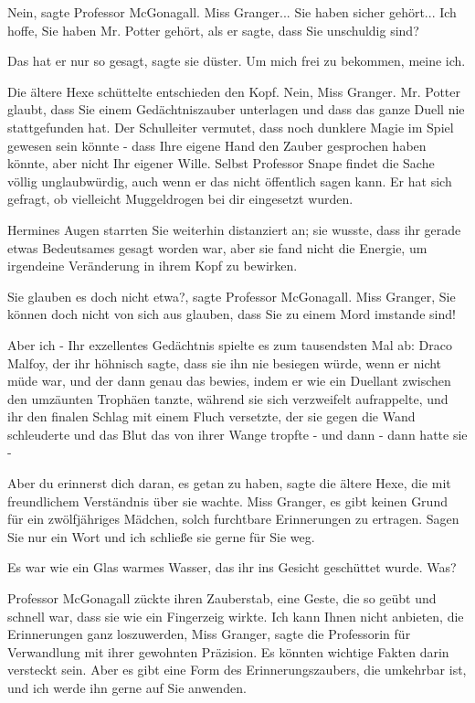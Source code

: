 \glqq Nein\grqq{}, sagte Professor McGonagall. \glqq Miss Granger... Sie haben
sicher gehört... Ich hoffe, Sie haben Mr. Potter gehört, als er sagte, dass Sie
unschuldig sind?\grqq{}

\glqq Das hat er nur so gesagt\grqq{}, sagte sie düster. \glqq Um mich frei zu
bekommen, meine ich.\grqq{}

Die ältere Hexe schüttelte entschieden den Kopf. \glqq Nein, Miss Granger. Mr.
Potter glaubt, dass Sie einem Gedächtniszauber unterlagen und dass das ganze
Duell nie stattgefunden hat. Der Schulleiter vermutet, dass noch dunklere Magie
im Spiel gewesen sein könnte - dass Ihre eigene Hand den Zauber gesprochen haben
könnte, aber nicht Ihr eigener Wille. Selbst Professor Snape findet die Sache
völlig unglaubwürdig, auch wenn er das nicht öffentlich sagen kann. Er hat sich
gefragt, ob vielleicht Muggeldrogen bei dir eingesetzt wurden.\grqq{}

Hermines Augen starrten Sie weiterhin distanziert an; sie wusste, dass ihr
gerade etwas Bedeutsames gesagt worden war, aber sie fand nicht die Energie, um
irgendeine Veränderung in ihrem Kopf zu bewirken.

\glqq Sie glauben es doch nicht etwa?\grqq{}, sagte Professor McGonagall. \glqq
Miss Granger, Sie können doch nicht von sich aus glauben, dass Sie zu einem Mord
imstande sind!\grqq{}

\glqq Aber ich -\grqq{} Ihr exzellentes Gedächtnis spielte es zum tausendsten
Mal ab: Draco Malfoy, der ihr höhnisch sagte, dass sie ihn nie besiegen würde,
wenn er nicht müde war, und der dann genau das bewies, indem er wie ein Duellant
zwischen den umzäunten Trophäen tanzte, während sie sich verzweifelt
aufrappelte, und ihr den finalen Schlag mit einem Fluch versetzte, der sie gegen
die Wand schleuderte und das Blut das von ihrer Wange tropfte - und dann - dann
hatte sie -

\glqq Aber du erinnerst dich daran, es getan zu haben\grqq{}, sagte die ältere
Hexe, die mit freundlichem Verständnis über sie wachte. \glqq Miss Granger, es
gibt keinen Grund für ein zwölfjähriges Mädchen, solch furchtbare Erinnerungen
zu ertragen. Sagen Sie nur ein Wort und ich schließe sie gerne für Sie
weg.\grqq{}

Es war wie ein Glas warmes Wasser, das ihr ins Gesicht geschüttet wurde. \glqq
Was?\grqq{}

Professor McGonagall zückte ihren Zauberstab, eine Geste, die so geübt und
schnell war, dass sie wie ein Fingerzeig wirkte. \glqq Ich kann Ihnen nicht
anbieten, die Erinnerungen ganz loszuwerden, Miss Granger\grqq{}, sagte die
Professorin für Verwandlung mit ihrer gewohnten Präzision. \glqq Es könnten
wichtige Fakten darin versteckt sein. Aber es gibt eine Form des
Erinnerungszaubers, die umkehrbar ist, und ich werde ihn gerne auf Sie
anwenden.\grqq{}

